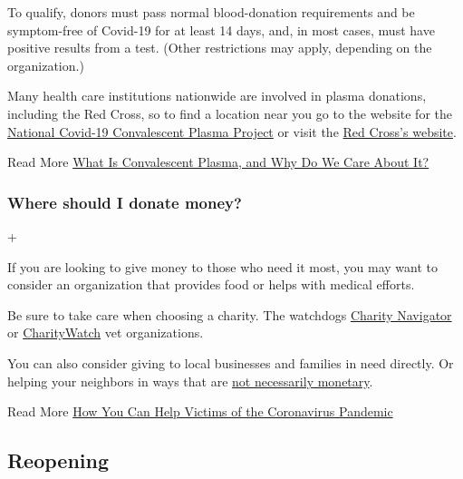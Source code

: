 To qualify, donors must pass normal blood-donation requirements and be
symptom-free of Covid-19 for at least 14 days, and, in most cases, must
have positive results from a test. (Other restrictions may apply,
depending on the organization.)

Many health care institutions nationwide are involved in plasma
donations, including the Red Cross, so to find a location near you go to
the website for the \href{https://ccpp19.org/}{National Covid-19
Convalescent Plasma Project} or visit the
\href{https://www.redcrossblood.org/donate-blood/dlp/plasma-donations-from-recovered-covid-19-patients.html}{Red
Cross's website}.

Read More
\href{https://www.nytimes3xbfgragh.onion/2020/04/24/smarter-living/coronavirus-convalescent-plasma-antibodies.html}{What
Is Convalescent Plasma, and Why Do We Care About It?}

\hypertarget{where-should-i-donate-money}{%
\subsubsection{Where should I donate
money?}\label{where-should-i-donate-money}}

+

If you are looking to give money to those who need it most, you may want
to consider an organization that provides food or helps with medical
efforts.

Be sure to take care when choosing a charity. The watchdogs
\href{https://www.charitynavigator.org/index.cfm?bay=content.view\&cpid=7779\&mod=article_inline}{Charity
Navigator} or
\href{https://www.charitywatch.org/charity-donating-articles/coronavirus-outbreak?mod=article_inline}{CharityWatch}
vet organizations.

You can also consider giving to local businesses and families in need
directly. Or helping your neighbors in ways that are
\href{https://www.nytimes3xbfgragh.onion/2020/03/15/smarter-living/wirecutter/5-ways-to-help-during-coronavirus-while-social-distancing.html}{not
necessarily monetary}.

Read More
\href{https://www.nytimes3xbfgragh.onion/article/coronavirus-how-to-help-donations-charities.html}{How
You Can Help Victims of the Coronavirus Pandemic}

\hypertarget{reopening}{%
\subsection{Reopening}\label{reopening}}

